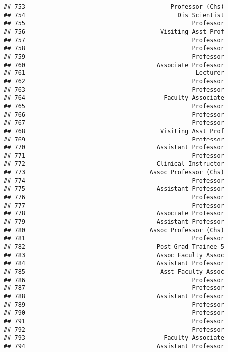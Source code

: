 \documentclass[
]{article}
\begin{document}
\begin{verbatim}
## 753                                         Professor (Chs)
## 754                                           Dis Scientist
## 755                                               Professor
## 756                                      Visiting Asst Prof
## 757                                               Professor
## 758                                               Professor
## 759                                               Professor
## 760                                     Associate Professor
## 761                                                Lecturer
## 762                                               Professor
## 763                                               Professor
## 764                                       Faculty Associate
## 765                                               Professor
## 766                                               Professor
## 767                                               Professor
## 768                                      Visiting Asst Prof
## 769                                               Professor
## 770                                     Assistant Professor
## 771                                               Professor
## 772                                     Clinical Instructor
## 773                                   Assoc Professor (Chs)
## 774                                               Professor
## 775                                     Assistant Professor
## 776                                               Professor
## 777                                               Professor
## 778                                     Associate Professor
## 779                                     Assistant Professor
## 780                                   Assoc Professor (Chs)
## 781                                               Professor
## 782                                     Post Grad Trainee 5
## 783                                     Assoc Faculty Assoc
## 784                                     Assistant Professor
## 785                                      Asst Faculty Assoc
## 786                                               Professor
## 787                                               Professor
## 788                                     Assistant Professor
## 789                                               Professor
## 790                                               Professor
## 791                                               Professor
## 792                                               Professor
## 793                                       Faculty Associate
## 794                                     Assistant Professor

\end{verbatim}
\end{document}
